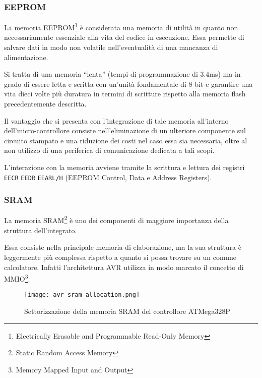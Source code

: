 \subsubsection{EEPROM}

La memoria EEPROM\footnote{Electrically Erasable and Programmable Read-Only Memory} è considerata una memoria di utilità in quanto non necessariamente essenziale alla vita del codice in esecuzione. Essa permette di salvare dati in modo non volatile nell'eventualità di una mancanza di alimentazione.

Si tratta di una memoria ``lenta'' (tempi di programmazione di 3.4ms\cite[tab 8-1]{avr:m328p}) ma in grado di essere letta e scritta con un'unità fondamentale di 8 bit\cite[sec 8.4]{avr:m328p} e garantire una vita dieci volte più duratura in termini di scritture rispetto alla memoria flash precedentemente descritta\cite[sec 8.2, sec 8.4]{avr:m328p}.

Il vantaggio che si presenta con l'integrazione di tale memoria all'interno dell'micro-controllore consiste nell'eliminazione di un ulteriore componente sul circuito stampato e una riduzione dei costi nel caso essa sia necessaria, oltre al non utilizzo di una periferica di comunicazione dedicata a tali scopi.

L'interazione con la memoria avviene tramite la scrittura e lettura dei registri \texttt{EECR} \texttt{EEDR} \texttt{EEARL/H} (EEPROM Control, Data e Address Registers)\cite[34]{avr:m328p}.

\subsubsection{SRAM}
La memoria SRAM\footnote{Static Random Access Memory} è uno dei componenti di maggiore importanza della struttura dell'integrato.

Essa consiste nella principale memoria di elaborazione, ma la sua struttura è leggermente più complessa rispetto a quanto si possa trovare su un comune calcolatore.
Infatti l'architettura AVR utilizza in modo marcato il concetto di MMIO\footnote{Memory Mapped Input and Output}.

\begin{figure}[b]
    \centering
    \texttt{[image: avr\_sram\_allocation.png]}
    \caption[Immagine ottenuta dal documento~\cite{avr:m328p}, fig. 8-3]{Settorizzazione della memoria SRAM del controllore ATMega328P\cite[fig 8-3]{avr:m328p}}\label{fig:avr-sram-alloc}
\end{figure}

